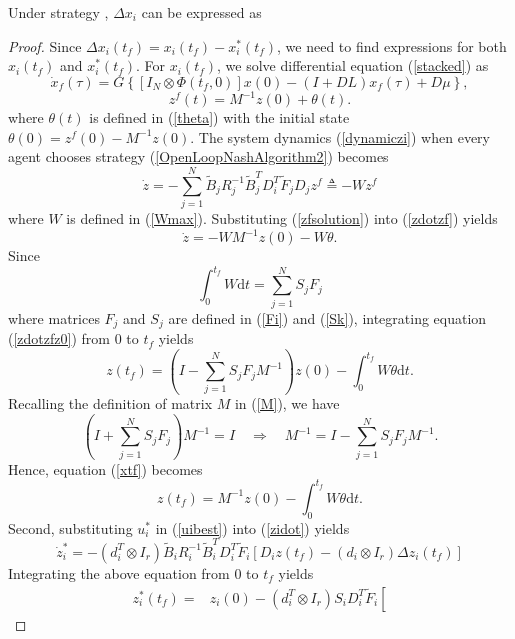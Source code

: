 \documentclass[12pt,draftcls,onecolumn]{IEEEtran}  %
\begin{document}
\begin{Lem}
Under strategy , $\Delta x_i$ can be expressed as
\end{Lem}
\begin{proof}
Since $\Delta x_i(t_f)=x_i(t_f)-x_i^*(t_f)$, we need to find expressions for both $x_i(t_f)$ and $x_i^*(t_f)$. For $x_i(t_f)$, we solve differential equation (\ref{stacked}) as
\[\dot{x}_{f}(\tau)=G\left\{[I_N\otimes\Phi(t_f,0)]x(0)-(I+DL)x_f(\tau)+D\mu\right\},\]
\begin{equation}
z^f(t)=M^{-1}z(0)+\theta(t).\label{zfsolution}
\end{equation}
where $\theta(t)$ is defined in (\ref{theta}) with the initial state $\theta(0)=z^f(0)-M^{-1}z(0)$. The system dynamics
(\ref{dynamiczi}) when every agent chooses strategy
(\ref{OpenLoopNashAlgorithm2}) becomes
\begin{equation}
\dot{z}= -\sum^N_{j=1}\tilde{B}_jR^{-1}_j\tilde{B}_j^T
D_i^T\tilde{F}_jD_jz^f\triangleq -Wz^f\label{zdotzf}
\end{equation}
where $W$ is defined in (\ref{Wmax}). Substituting (\ref{zfsolution}) into
(\ref{zdotzf}) yields
\begin{equation}
\dot{z}=-WM^{-1}z(0)-W\theta.  \label{zdotzfz0}
\end{equation}
Since
\[\int^{t_f}_0W\mbox{d}t=\sum^N_{j=1}S_jF_j\]
where matrices $F_j$ and $S_j$ are defined in (\ref{Fi}) and (\ref{Sk}),
integrating equation (\ref{zdotzfz0}) from $0$ to $t_f$ yields
\begin{equation}
z(t_f)=\left(I-\sum^N_{j=1}S_jF_jM^{-1}\right)z(0)
-\int^{t_f}_0W\theta\mbox{d}t. \label{xtf}
\end{equation}
Recalling the definition of matrix $M$ in (\ref{M}), we have
\[\left(I+\sum^N_{j=1}S_jF_j\right)M^{-1} =I\quad\Longrightarrow\quad
M^{-1}=I-\sum^N_{j=1}S_jF_jM^{-1}.\]
Hence, equation (\ref{xtf}) becomes
\begin{equation}
z(t_f)=M^{-1}z(0) -\int^{t_f}_0W\theta\mbox{d}t. \label{xtf1}
\end{equation}
Second, substituting $u^*_i$ in (\ref{uibest}) into (\ref{zidot}) yields
\[\dot{z}^*_i=-(d_i^T\otimes
I_r)\tilde{B}_iR_i^{-1}\tilde{B}_i^TD_i^T\tilde{F}_i \left[
D_iz(t_f)-(d_i\otimes I_r)\Delta z_i(t_f)\right]\]
Integrating the above equation from $0$ to $t_f$ yields
\begin{align*}
z_i^*(t_f)=&z_i(0)-(d_i^T\otimes I_r)S_iD_i^T\tilde{F}_i\left[

\end{align*}
\end{proof}
\end{document}

